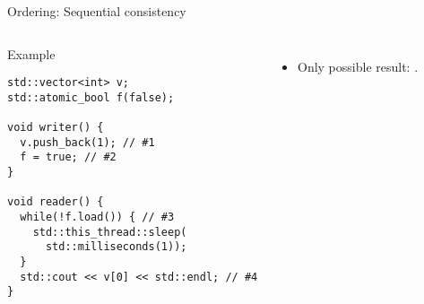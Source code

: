 \begin{frame}[fragile]{Ordering: Sequential consistency}
\begin{columns}[T]


\begin{block}{Example}
\begin{lstlisting}
std::vector<int> v; 
std::atomic_bool f(false); 

void writer() { 
  v.push_back(1); // #1
  f = true; // #2
}

void reader() { 
  while(!f.load()) { // #3
    std::this_thread::sleep(
      std::milliseconds(1)); 
  }
  std::cout << v[0] << std::endl; // #4
} 
\end{lstlisting}
\end{block}




\begin{itemize}
  \item Only possible result: .
\end{itemize}
\end{columns}

\end{frame}

